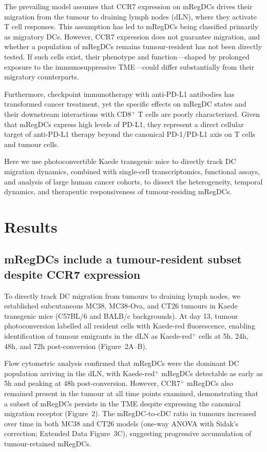 \documentclass[11pt]{article}
\begin{document}
The prevailing model assumes that CCR7 expression on mRegDCs drives their migration from the tumour to draining lymph nodes (dLN), where they activate T cell responses. This assumption has led to mRegDCs being classified primarily as migratory DCs. However, CCR7 expression does not guarantee migration, and whether a population of mRegDCs remains tumour-resident has not been directly tested. If such cells exist, their phenotype and function---shaped by prolonged exposure to the immunosuppressive TME---could differ substantially from their migratory counterparts.

Furthermore, checkpoint immunotherapy with anti-PD-L1 antibodies has transformed cancer treatment, yet the specific effects on mRegDC states and their downstream interactions with CD8$^{+}$ T cells are poorly characterized. Given that mRegDCs express high levels of PD-L1, they represent a direct cellular target of anti-PD-L1 therapy beyond the canonical PD-1/PD-L1 axis on T cells and tumour cells.

Here we use photoconvertible Kaede transgenic mice to directly track DC migration dynamics, combined with single-cell transcriptomics, functional assays, and analysis of large human cancer cohorts, to dissect the heterogeneity, temporal dynamics, and therapeutic responsiveness of tumour-residing mRegDCs.

\section{Results}

\subsection{mRegDCs include a tumour-resident subset despite CCR7 expression}

To directly track DC migration from tumours to draining lymph nodes, we established subcutaneous MC38, MC38-Ova, and CT26 tumours in Kaede transgenic mice (C57BL/6 and BALB/c backgrounds). At day 13, tumour photoconversion labelled all resident cells with Kaede-red fluorescence, enabling identification of tumour emigrants in the dLN as Kaede-red$^{+}$ cells at 5h, 24h, 48h, and 72h post-conversion (Figure~2A--B).

Flow cytometric analysis confirmed that mRegDCs were the dominant DC population arriving in the dLN, with Kaede-red$^{+}$ mRegDCs detectable as early as 5h and peaking at 48h post-conversion. However, CCR7$^{+}$ mRegDCs also remained present in the tumour at all time points examined, demonstrating that a subset of mRegDCs persists in the TME despite expressing the canonical migration receptor (Figure~2). The mRegDC-to-cDC ratio in tumours increased over time in both MC38 and CT26 models (one-way ANOVA with Sidak's correction; Extended Data Figure~3C), suggesting progressive accumulation of tumour-retained mRegDCs.
\end{document}
